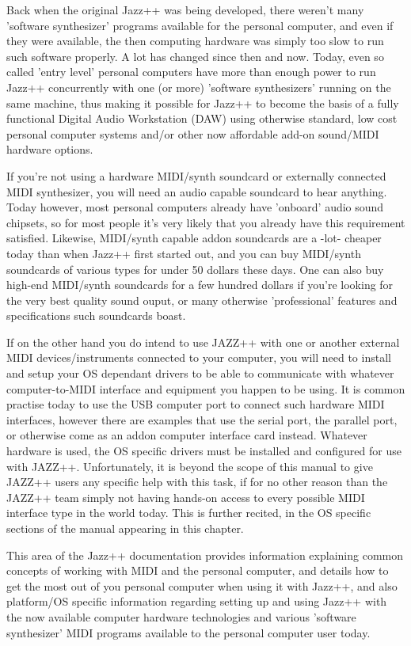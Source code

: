 \documentclass[letterpaper]{report}
\begin{document}
Back when the original Jazz++ was being developed, there weren't many 'software
synthesizer' programs available for the personal computer, and even if they were
available, the then computing hardware was simply too slow to run such software
properly. A lot has changed since then and now. Today, even so called 'entry
level' personal computers have more than enough power to run Jazz++ concurrently
with one (or more) 'software synthesizers' running on the same machine, thus
making it possible for Jazz++ to become the basis of a fully functional Digital
Audio Workstation (DAW) using otherwise standard, low cost personal computer
systems and/or other now affordable add-on sound/MIDI hardware options.


If you're not using a hardware MIDI/synth soundcard or externally connected
MIDI synthesizer, you will need an audio capable soundcard to hear anything.
Today however, most personal computers already have 'onboard' audio sound
chipsets, so for most people it's very likely that you already have this
requirement satisfied. Likewise, MIDI/synth capable addon soundcards are a -lot-
cheaper today than when Jazz++ first started out, and you can buy MIDI/synth
soundcards of various types for under 50 dollars these days. One can also buy
high-end MIDI/synth soundcards for a few hundred dollars if you're looking for
the very best quality sound ouput, or many otherwise 'professional' features 
and specifications such soundcards boast.

If on the other hand you do intend to use JAZZ++ with one or another external
MIDI devices/instruments connected to your computer, you will need to install
and setup your OS dependant drivers to be able to communicate with whatever
computer-to-MIDI interface and equipment you happen to be using. It is common
practise today to use the USB computer port to connect such hardware MIDI
interfaces, however there are examples that use the serial port, the parallel
port, or otherwise come as an addon computer interface card instead. Whatever
hardware is used, the OS specific drivers must be installed and configured for
use with JAZZ++. Unfortunately, it is beyond the scope of this manual to give
JAZZ++ users any specific help with this task, if for no other reason than the
JAZZ++ team simply not having hands-on access to every possible MIDI interface
type in the world today. This is further recited, in the OS specific sections
of the manual appearing in this chapter.
 

This area of the Jazz++ documentation provides information explaining common
concepts of working with MIDI and the personal computer, and details how to
get the most out of you personal computer when using it with Jazz++, and also
platform/OS specific information regarding setting up and using Jazz++ with the
now available computer hardware technologies and various 'software synthesizer'
MIDI programs available to the personal computer user today.
\end{document}
